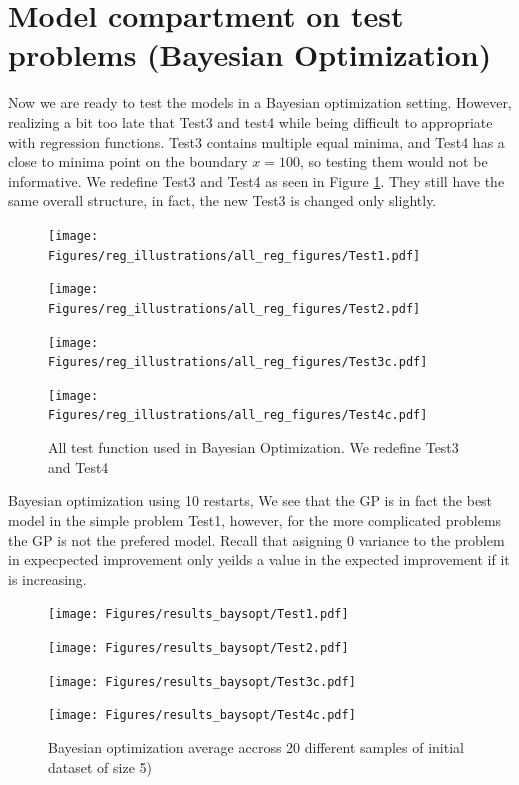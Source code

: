\section{Model compartment on test problems (Bayesian Optimization)}
Now we are ready to test the models in a Bayesian optimization setting. However, realizing a bit too
late that Test3 and test4 while being difficult to appropriate with regression functions. Test3
contains multiple equal minima, and Test4 has a close to minima point on the boundary $x=100$, so
testing them would not be informative. We redefine Test3 and Test4 as seen in Figure
\ref{TEST_problems2}. They still have the same overall structure, in fact, the new Test3 is changed only
slightly.

\begin{figure}[h]
  \centering
  \begin{minipage}[b]{0.24\textwidth}
   \texttt{[image: Figures/reg\_illustrations/all\_reg\_figures/Test1.pdf]}
  \end{minipage}
  \hfill
  \begin{minipage}[b]{0.24\textwidth}
    \texttt{[image: Figures/reg\_illustrations/all\_reg\_figures/Test2.pdf]}
   \end{minipage}
   \hfill
   \begin{minipage}[b]{0.24\textwidth}
    \texttt{[image: Figures/reg\_illustrations/all\_reg\_figures/Test3c.pdf]}
   \end{minipage}
   \hfill
   \begin{minipage}[b]{0.24\textwidth}
     \texttt{[image: Figures/reg\_illustrations/all\_reg\_figures/Test4c.pdf]}
    \end{minipage}
  \caption{All test function used in Bayesian Optimization. We redefine Test3 and Test4}
  \label{TEST_problems2}
\end{figure}


Bayesian optimization using 10 restarts, We see that the GP is in fact the best model in the simple
problem Test1, however, for the more complicated problems the GP is not the prefered model. Recall
that asigning 0 variance to the problem in expecpected improvement only yeilds a value in the
expected improvement if it is increasing. 

\begin{figure}[H]
  \centering
  \begin{minipage}[b]{0.49\textwidth}
   \texttt{[image: Figures/results\_baysopt/Test1.pdf]}
  \end{minipage}
  \hfill
  \begin{minipage}[b]{0.49\textwidth}
    \texttt{[image: Figures/results\_baysopt/Test2.pdf]}
   \end{minipage}
   \begin{minipage}[b]{0.49\textwidth}
    \texttt{[image: Figures/results\_baysopt/Test3c.pdf]}
   \end{minipage}
   \hfill
   \begin{minipage}[b]{0.49\textwidth}
     \texttt{[image: Figures/results\_baysopt/Test4c.pdf]}
    \end{minipage}
  \caption{Bayesian optimization average accross 20 different samples of initial dataset of size 5)}
  \label{Test_bayesOpt}
\end{figure}


